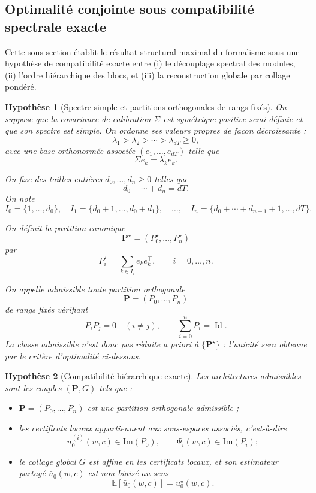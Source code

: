 \documentclass[11pt,a4paper]{article}
\newtheorem{assumption}{Hypothèse}[section]
\DeclareMathOperator{\Id}{Id}
\newcommand{\1}{\mathbf 1}
\begin{document}
\subsection{Optimalité conjointe sous compatibilité spectrale exacte}

Cette sous-section établit le résultat structural maximal du formalisme sous une hypothèse de compatibilité exacte entre
(i) le découplage spectral des modules,
(ii) l'ordre hiérarchique des blocs, et
(iii) la reconstruction globale par collage pondéré.

\begin{assumption}[Spectre simple et partitions orthogonales de rangs fixés]
On suppose que la covariance de calibration \(\Sigma\) est symétrique positive semi-définie
et que son spectre est simple.
On ordonne ses valeurs propres de façon décroissante :
\[
\lambda_1>\lambda_2>\cdots>\lambda_{dT}\ge 0,
\]
avec une base orthonormée associée \((e_1,\dots,e_{dT})\) telle que
\[
\Sigma e_k=\lambda_k e_k.
\]

On fixe des tailles entières \(d_0,\dots,d_n\ge 0\) telles que
\[
d_0+\cdots+d_n=dT.
\]
On note
\[
I_0=\{1,\dots,d_0\},\quad
I_1=\{d_0+1,\dots,d_0+d_1\},\quad \dots,\quad
I_n=\{d_0+\cdots+d_{n-1}+1,\dots,dT\}.
\]

On définit la partition canonique
\[
\mathbf P^\star=(P_0^\star,\dots,P_n^\star)
\]
par
\[
P_i^\star=\sum_{k\in I_i} e_ke^\top_k,
\qquad i=0,\dots,n.
\]

On appelle \emph{admissible} toute partition orthogonale
\[
\mathbf P=(P_0,\dots,P_n)
\]
de rangs fixés vérifiant
\[
P_iP_j=0\quad(i\neq j),
\qquad
\sum_{i=0}^n P_i=\Id.
\]
La classe admissible n'est donc pas réduite a priori à \(\{\mathbf P^\star\}\) :
l'unicité sera obtenue par le critère d'optimalité ci-dessous.
\end{assumption}

\begin{assumption}[Compatibilité hiérarchique exacte]
Les architectures admissibles sont les couples \((\mathbf P,G)\) tels que :

\begin{itemize}[leftmargin=2em]
    \item \(\mathbf P=(P_0,\dots,P_n)\) est une partition orthogonale admissible ;
    \item les certificats locaux appartiennent aux sous-espaces associés, c'est-à-dire
    \[
    u_0^{(i)}(w,c)\in \mathrm{Im}(P_0),
    \qquad
    \Psi_i(w,c)\in \mathrm{Im}(P_i);
    \]
    \item le collage global \(G\) est affine en les certificats locaux, et son estimateur partagé
    \(\bar u_0(w,c)\) est non biaisé au sens
    \[
    \mathbb E[\bar u_0(w,c)]=u_0^\star(w,c).
    \]
\end{itemize}
\end{assumption}
\end{document}
